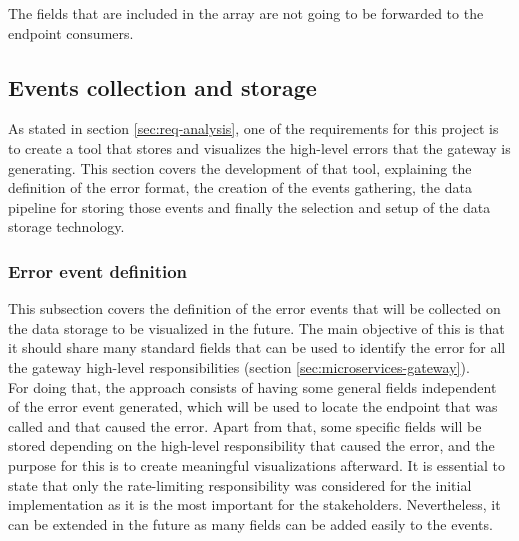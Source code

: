 \documentclass[english, 12pt, a4paper, sci, utf8, a-1b, online]{aaltothesis}
\begin{document}
The fields that are included in the array are not going to be forwarded to the endpoint consumers.


\subsection{Events collection and storage}



As stated in section \ref{sec:req-analysis}, one of the requirements for this project is to create a tool that stores and visualizes the high-level errors that the gateway is generating. This section covers the development of that tool, explaining the definition of the error format, the creation of the events gathering, the data pipeline for storing those events and finally the selection and setup of the data storage technology.

\subsubsection{Error event definition}
\label{sec:error-event-definition}

This subsection covers the definition of the error events that will be collected on the data storage to be visualized in the future. The main objective of this is that it should share many standard fields that can be used to identify the error for all the gateway high-level responsibilities (section \ref{sec:microservices-gateway}).\\

For doing that, the approach consists of having some general fields independent of the error event generated, which will be used to locate the endpoint that was called and that caused the error. Apart from that, some specific fields will be stored depending on the high-level responsibility that caused the error, and the purpose for this is to create meaningful visualizations afterward. It is essential to state that only the rate-limiting responsibility was considered for the initial implementation as it is the most important for the stakeholders. Nevertheless, it can be extended in the future as many fields can be added easily to the events.\\
\end{document}
